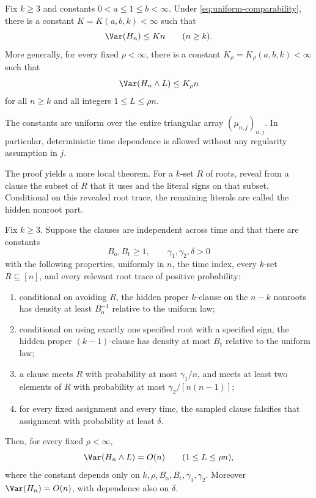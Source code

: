 \begin{theorem}
\label{thm:main}
Fix $k\ge3$ and constants $0<a\le1\le b<\infty$.  Under
\eqref{eq:uniform-comparability}, there is a constant
$K=K(a,b,k)<\infty$ such that
\[
    \Var(H_n)\le Kn
    \qquad(n\ge k).
\]
More generally, for every fixed $\rho<\infty$, there is a constant
$K_\rho=K_\rho(a,b,k)<\infty$ such that
\[
    \Var(H_n\wedge L)\le K_\rho n
\]
for all $n\ge k$ and all integers $1\le L\le \rho n$.
\end{theorem}

The constants are uniform over the entire triangular array
$(\mu_{n,j})_{n,j}$.  In particular, deterministic time dependence is
allowed without any regularity assumption in $j$.

The proof yields a more local theorem.  For a $k$-set $R$ of roots, reveal
from a clause the subset of $R$ that it uses and the literal signs on that
subset.  Conditional on this revealed root trace, the remaining literals are
called the hidden nonroot part.

\begin{theorem}\label{thm:local-criterion}
Fix $k\ge3$.  Suppose the clauses are independent across time and that there
are constants
\[
 B_{\mathrm{o}},B_{\mathrm{t}}\ge1,\qquad
 \gamma_1,\gamma_2,\delta>0
\]
with the following properties, uniformly in $n$, the time index, every
$k$-set $R\subseteq[n]$, and every relevant root trace of positive
probability:
\begin{enumerate}[label=\textnormal{(\roman*)}]
\item conditional on avoiding $R$, the hidden proper $k$-clause on the
      $n-k$ nonroots has density at least $B_{\mathrm{o}}^{-1}$ relative to the
      uniform law;
\item conditional on using exactly one specified root with a specified sign,
      the hidden proper $(k-1)$-clause has density at most $B_{\mathrm{t}}$
      relative to the uniform law;
\item a clause meets $R$ with probability at most $\gamma_1/n$, and meets at
      least two elements of $R$ with probability at most
      $\gamma_2/[n(n-1)]$;
\item for every fixed assignment and every time, the sampled clause falsifies
      that assignment with probability at least $\delta$.
\end{enumerate}
Then, for every fixed $\rho<\infty$,
\[
 \Var(H_n\wedge L)=O(n)\qquad(1\le L\le\rho n),
\]
where the constant depends only on
$k,\rho,B_{\mathrm{o}},B_{\mathrm{t}},\gamma_1,\gamma_2$.  Moreover
$\Var(H_n)=O(n)$, with dependence also on $\delta$.
\end{theorem}

